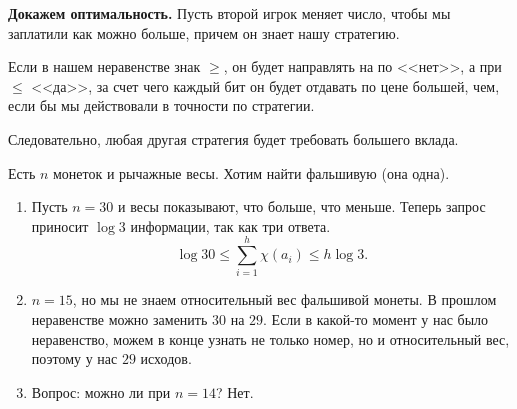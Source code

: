 \textbf{Докажем оптимальность.} Пусть второй игрок меняет число, чтобы мы заплатили как можно больше, причем он знает нашу стратегию.

Если в нашем неравенстве знак $ \ge $, он будет направлять на по <<нет>>, а при  $ \le$ <<да>>, за счет чего каждый бит он будет отдавать по цене большей, чем, если бы мы действовали в точности по стратегии. 

Следовательно, любая другая стратегия будет требовать большего вклада.


\begin{prac}
	Есть $ n$ монеток и рычажные весы. Хотим найти фальшивую (она одна). 
\begin{enumerate}
    \item Пусть $ n = 30$ и весы показывают, что больше, что меньше. Теперь запрос приносит $  \log 3$ информации, так как три ответа.
		\[
			\log 30 \le  \sum_{i=1}^{h} \chi(a_i) \le h \log 3 
		.\] 
	\item $ n = 15$, но мы не знаем относительный вес фальшивой монеты. В прошлом неравенстве можно заменить  $ 30$ на $ 29$. Если в какой-то момент у нас было неравенство, можем в конце узнать не только номер, но и относительный вес, поэтому у нас $ 29$ исходов.
	\item Вопрос: можно ли при $ n=14$?  Нет. 
\end{enumerate} 
\end{prac}
